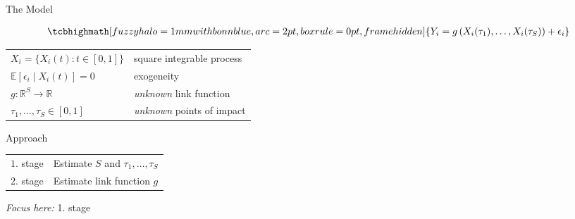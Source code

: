 \begin{frame}{The Model}

    \vspace{-1cm}
    \begin{align*}
        \tcbhighmath[fuzzy halo=1mm with bonnblue,arc=2pt, boxrule=0pt,frame
        hidden]{
            Y_i = g\left(X_i(\tau_1), \dots, X_i(\tau_S) \right) +  \epsilon_i
        }
    \end{align*}

    \vspace{0.5cm}
    \begin{table}[]
    \renewcommand{\arraystretch}{1.5}
        \begin{tabular}{ll}
           $X_i = \{ X_i(t) : t \in [0, 1]\}$ & square integrable process\\
           $\mathbb{E}\left[\epsilon_i \mid X_i(t) \right] = 0$ &  exogeneity\\
           $g : \mathbb{R}^S \to \mathbb{R}$ & \emph{unknown} link function \\
           $\tau_1, \dots, \tau_S \in [0, 1]$ &  \emph{unknown} points of impact
        \end{tabular}
    \end{table}

\end{frame}


\begin{frame}{Approach}

    \begin{table}[]
    \renewcommand{\arraystretch}{1.5}
        \begin{tabular}{ll}

        \textcolor{bonnblue}{$1$. stage} & Estimate $S$ and $\tau_1, \dots, \tau_S$\\
        \textcolor{bonnblue}{$2$. stage} & Estimate link function $g$

        \end{tabular}
    \end{table}


    \pause
    \vspace{1cm}
    \emph{Focus here:} 1. stage

\end{frame}

